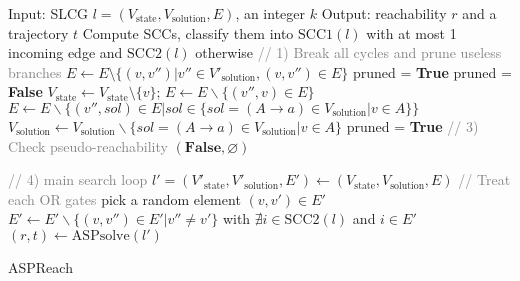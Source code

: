 \begin{algorithm}[htb]
\begin{algorithmic}[1]
\State Input: SLCG $l=(V_{\mathrm{state}},V_{\mathrm{solution}}, E)$, an integer $k$
\State Output: reachability $r$ and a trajectory $t$
\State Compute SCCs, classify them into $\mathrm{SCC1}(l)$ with at most 1 incoming edge and $\mathrm{SCC2}(l)$ otherwise
\State \textcolor{gray}{// 1) Break all cycles and prune useless branches}\label{delete_cycle_begin}
        \State $E\gets E\setminus \{(v,v'')|v''\in V'_{\mathrm{solution}},(v,v'')\in E\}$
    \EndIf
\EndFor
\EndFor \label{delete_cycle_end}
\State{\textcolor{gray}{// 2) remove useless nodes/edges}} \label{prune_begin}
\State pruned = \textbf{True}
    \State pruned = \textbf{False}
            \State $V_{\mathrm{state}} \gets V_{\mathrm{state}}\setminus \{v\}$; $E\gets E\backslash \{ (v'',v)\in E\}$
            \State $E\gets E\backslash \{ (v'',sol)\in E | sol \in \{sol = (A \rightarrow a) \in V_{\mathrm{solution}} | v \in A\}\}$
            \State $V_{\mathrm{solution}} \gets V_{\mathrm{solution}}\backslash \{sol = (A \rightarrow a) \in V_{\mathrm{solution}} | v \in A\}$
            \State pruned = \textbf{True}
        \EndIf
    \EndFor \label{prune_end}
\EndWhile
\State \textcolor{gray}{// 3) Check pseudo-reachability} \label{pseudo_reach_begin}
    \State \Return $(\mathbf{False},\varnothing)$
\EndIf \label{pseudo_reach_end}

\State \textcolor{gray}{// 4) main search loop} \label{main_loop_begin}
    \State $l'=(V'_{\mathrm{state}}, V'_{\mathrm{solution}},E')\gets(V_{\mathrm{state}}, V_{\mathrm{solution}},E)$ 
     \textcolor{gray}{// Treat each OR gates}
        \State pick a random element $(v,v') \in E'$
        \State $E'\gets E' \backslash  \{(v,v'') \in E'| v''\neq v'\}$ with $\nexists i\in \mathrm{SCC2}(l)$ and $i\in E'$
    \EndFor
    \State $(r,t)\gets\mathrm{ASPsolve}(l')$
    \EndIf
\EndFor \label{main_loop_end}
\State {}
\end{algorithmic}
\caption{ASPReach}\label{algOverall}
\end{algorithm}

